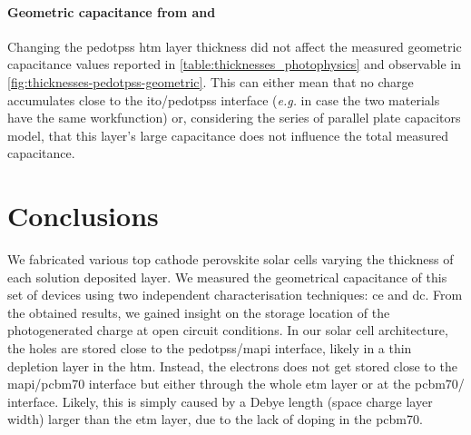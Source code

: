 	\paragraph{Geometric capacitance from  and }
	Changing the \gls{pedotpss} \gls{htm} layer thickness did not affect the measured geometric capacitance values reported in \cref{table:thicknesses_photophysics} and observable in \cref{fig:thicknesses-pedotpss-geometric}.
	This can either mean that no charge accumulates close to the \gls{ito}\-/\gls{pedotpss} interface (\textsl{e.g.} in case the two materials have the same workfunction) or, considering the series of parallel plate capacitors model, that this layer's large capacitance does not influence the total measured capacitance.


\section{Conclusions}
We fabricated various top cathode perovskite solar cells varying the thickness of each solution deposited layer.
We measured the geometrical capacitance of this set of devices using two independent characterisation techniques: \gls{ce} and \gls{dc}.
From the obtained results, we gained insight on the storage location of the photogenerated charge at open circuit conditions.
In our solar cell architecture, the holes are stored close to the \gls{pedotpss}\-/\gls{mapi} interface, likely in a thin depletion layer in the \gls{htm}.
Instead, the electrons does not get stored close to the \gls{mapi}\-/\gls{pcbm70} interface but either through the whole \gls{etm} layer or at the \gls{pcbm70}\-/ interface.
Likely, this is simply caused by a Debye length (space charge layer width) larger than the \gls{etm} layer, due to the lack of doping in the \gls{pcbm70}. 



